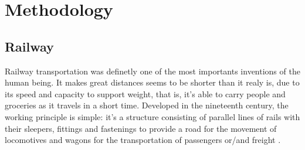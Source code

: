 \chapter{Methodology}\label{cha:methodology}
\section{Railway}\label{sec:railway}

Railway transportation was definetly one of the most importants inventions of the human being. It makes great distances seems to be shorter than it realy is, due to its speed and capacity to support weight, that is, it's able to carry people and groceries as it travels in a short time. Developed in the nineteenth century, the working principle is simple: it's a structure consisting of parallel lines of rails with their sleepers, fittings and fastenings to provide a road for the movement of locomotives and wagons for the transportation of passengers or/and freight \citep{mundrey_railway_2010}.